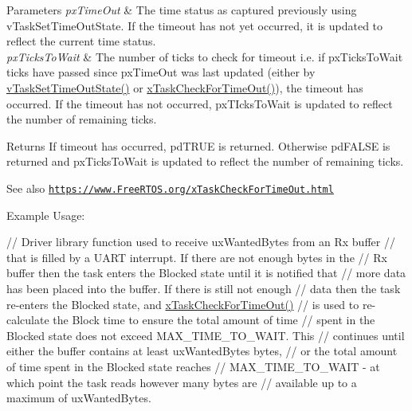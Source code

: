 \begin{DoxyParams}{Parameters}
{\em px\+Time\+Out} & The time status as captured previously using v\+Task\+Set\+Time\+Out\+State. If the timeout has not yet occurred, it is updated to reflect the current time status. \\
\hline
{\em px\+Ticks\+To\+Wait} & The number of ticks to check for timeout i.\+e. if px\+Ticks\+To\+Wait ticks have passed since px\+Time\+Out was last updated (either by \hyperlink{externals_2freertos_2include_2task_8h_a67155ad4ea2482b5f4597a69f2152be0}{v\+Task\+Set\+Time\+Out\+State()} or \hyperlink{externals_2freertos_2include_2task_8h_a3b018a85d339e536a6c05748dd666a3a}{x\+Task\+Check\+For\+Time\+Out()}), the timeout has occurred. If the timeout has not occurred, px\+T\+Icks\+To\+Wait is updated to reflect the number of remaining ticks.\\
\hline
\end{DoxyParams}
\begin{DoxyReturn}{Returns}
If timeout has occurred, pd\+T\+R\+UE is returned. Otherwise pd\+F\+A\+L\+SE is returned and px\+Ticks\+To\+Wait is updated to reflect the number of remaining ticks.
\end{DoxyReturn}
\begin{DoxySeeAlso}{See also}
\href{https://www.FreeRTOS.org/xTaskCheckForTimeOut.html}{\tt https\+://www.\+Free\+R\+T\+O\+S.\+org/x\+Task\+Check\+For\+Time\+Out.\+html}
\end{DoxySeeAlso}
Example Usage\+: 
\begin{DoxyPre}
 // Driver library function used to receive uxWantedBytes from an Rx buffer
 // that is filled by a UART interrupt. If there are not enough bytes in the
 // Rx buffer then the task enters the Blocked state until it is notified that
 // more data has been placed into the buffer. If there is still not enough
 // data then the task re-enters the Blocked state, and \hyperlink{externals_2freertos_2include_2task_8h_a3b018a85d339e536a6c05748dd666a3a}{xTaskCheckForTimeOut()}
 // is used to re-calculate the Block time to ensure the total amount of time
 // spent in the Blocked state does not exceed MAX\_TIME\_TO\_WAIT. This
 // continues until either the buffer contains at least uxWantedBytes bytes,
 // or the total amount of time spent in the Blocked state reaches
 // MAX\_TIME\_TO\_WAIT - at which point the task reads however many bytes are
 // available up to a maximum of uxWantedBytes.\end{DoxyPre}




